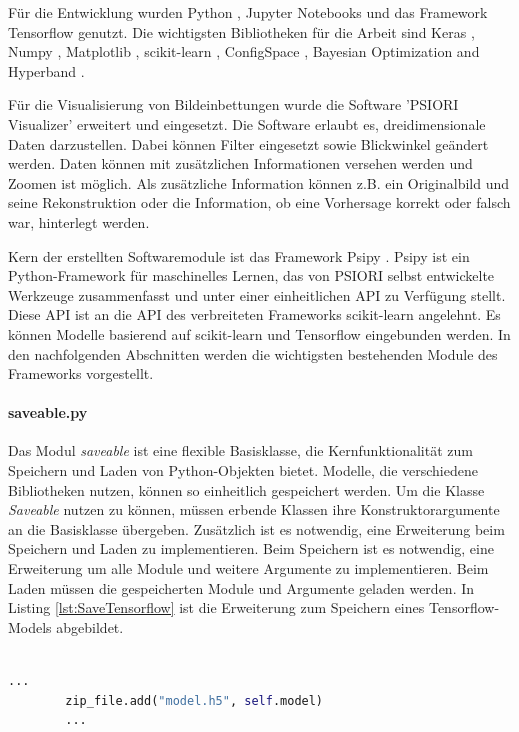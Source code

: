 	Für die Entwicklung wurden Python \cite{PythonSoftwareFoundation.2020}, Jupyter Notebooks \cite{ProjectJupyter.} und das Framework Tensorflow \cite{MartinAbadi.2015}  genutzt. Die wichtigsten Bibliotheken für die Arbeit sind Keras \cite{Chollet.2015} , Numpy \cite{Oliphant.2006} , Matplotlib \cite{Hunter.2007} , scikit-learn \cite{Pedregosa.2011} , ConfigSpace \cite{Lindauer.2019} , Bayesian Optimization and Hyperband \cite{StefanFalkner.2018}. 
	
	Für die Visualisierung von Bildeinbettungen wurde die Software 'PSIORI Visualizer' erweitert und eingesetzt. Die Software erlaubt es, dreidimensionale Daten darzustellen. Dabei können Filter eingesetzt sowie Blickwinkel geändert werden. Daten können mit zusätzlichen Informationen versehen werden und Zoomen ist möglich. Als zusätzliche Information können z.B. ein Originalbild und seine Rekonstruktion oder die Information, ob eine Vorhersage korrekt oder falsch war, hinterlegt werden.
	
	Kern der erstellten Softwaremodule ist das Framework Psipy \cite{PSIORIGmbH.2019}. Psipy ist ein Python-Framework für maschinelles Lernen, das von PSIORI selbst entwickelte Werkzeuge zusammenfasst und unter einer einheitlichen API zu Verfügung stellt. Diese API ist an die API des verbreiteten Frameworks scikit-learn angelehnt. Es können Modelle basierend auf scikit-learn  und Tensorflow eingebunden werden. In den nachfolgenden Abschnitten werden die wichtigsten bestehenden Module des Frameworks vorgestellt.
	
	 \paragraph{saveable.py} Das Modul \textit{saveable} ist eine flexible Basisklasse, die Kernfunktionalität zum Speichern und Laden von Python-Objekten bietet. Modelle, die verschiedene Bibliotheken nutzen, können so einheitlich gespeichert werden. Um die Klasse \textit{Saveable} nutzen zu können, müssen erbende Klassen ihre Konstruktorargumente an die Basisklasse übergeben. Zusätzlich ist es notwendig, eine Erweiterung beim Speichern und Laden zu implementieren. Beim Speichern ist es notwendig, eine Erweiterung um alle Module und weitere Argumente zu implementieren. Beim Laden müssen die gespeicherten Module und Argumente geladen werden. In Listing \ref{lst:SaveTensorflow} ist die Erweiterung zum Speichern eines Tensorflow-Models abgebildet. \\
	 \\
	\begin{lstlisting}[language=python,caption=Erweiterung zum Speichern eines Tensorflow Models, label=lst:SaveTensorflow]
		...
		zip_file.add("model.h5", self.model)
		...
	\end{lstlisting}

